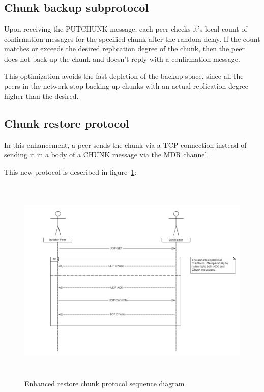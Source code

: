 \documentclass[a4paper]{article}
\begin{document}
\newpage

\subsection{Chunk backup subprotocol}
\label{sec:backup}

Upon receiving the PUTCHUNK message, each peer checks it's local count of confirmation messages for the specified chunk after the random delay. If the count matches or exceeds the desired replication degree of the chunk, then the peer does not back up the chunk and doesn't reply with a confirmation message.

This optimization avoids the fast depletion of the backup space, since all the peers in the network stop backing up chunks with an actual replication degree higher than the desired.

\subsection{Chunk restore protocol}
\label{sec:restore}

In this enhancement, a peer sends the chunk via a TCP connection instead of sending it in a body of a CHUNK message via the MDR channel.

This new protocol is described in figure~\ref{fig:restoreProtocol}:
\begin{figure}[h!]
\begin{center}
\includegraphics[height=10cm, width=12cm]{figures/enhanced_restore_protocol.png}
\caption{Enhanced restore chunk protocol sequence diagram}
\label{fig:restoreProtocol}
\end{center}
\end{figure}
\end{document}
